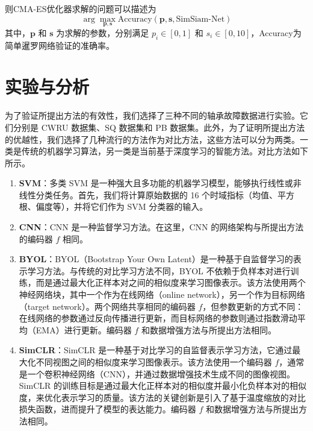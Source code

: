 \documentclass[master]{thesis-uestc}
\begin{document}
则CMA-ES优化器求解的问题可以描述为 
\begin{equation}
    \arg\max_{\mathbf{p}, \mathbf{s}} \text{Accuracy}(\mathbf{p}, \mathbf{s}, \text{SimSiam-Net})
\end{equation}
其中，\(\mathbf{p}\) 和 \(\mathbf{s}\) 为求解的参数，分别满足 \(p_i \in [0, 1]\) 和 \(s_i \in [0, 10]\)，Accuracy为简单暹罗网络验证的准确率。

\section{实验与分析}
为了验证所提出方法的有效性，我们选择了三种不同的轴承故障数据进行实验。它们分别是 CWRU 数据集、SQ 数据集和 PB 数据集。此外，为了证明所提出方法的优越性，我们选择了几种流行的方法作为对比方法，这些方法可以分为两类。一类是传统的机器学习算法，另一类是当前基于深度学习的智能方法。对比方法如下所示。
\begin{enumerate}
    \item \textbf{SVM}：多类 SVM 是一种强大且多功能的机器学习模型，能够执行线性或非线性分类任务。首先，我们将计算原始数据的 16 个时域指标（均值、平方根、偏度等），并将它们作为 SVM 分类器的输入。

    \item \textbf{CNN}：CNN 是一种监督学习方法。在这里，CNN 的网络架构与所提出方法的编码器 \(f\) 相同。

    \item \textbf{BYOL}：BYOL（Bootstrap Your Own Latent）是一种基于自监督学习的表示学习方法。与传统的对比学习方法不同，BYOL 不依赖于负样本对进行训练，而是通过最大化正样本对之间的相似度来学习图像表示。该方法使用两个神经网络块，其中一个作为在线网络（online network），另一个作为目标网络（target network）。两个网络共享相同的编码器 \(f\)，但参数更新的方式不同：在线网络的参数通过反向传播进行更新，而目标网络的参数则通过指数滑动平均（EMA）进行更新。编码器 \(f\) 和数据增强方法与所提出方法相同。
    
    \item \textbf{SimCLR}：SimCLR 是一种基于对比学习的自监督表示学习方法，它通过最大化不同视图之间的相似度来学习图像表示。该方法使用一个编码器 \(f\)，通常是一个卷积神经网络（CNN），并通过数据增强技术生成不同的图像视图。SimCLR 的训练目标是通过最大化正样本对的相似度并最小化负样本对的相似度，来优化表示学习的质量。该方法的关键创新是引入了基于温度缩放的对比损失函数，进而提升了模型的表达能力。编码器 \(f\) 和数据增强方法与所提出方法相同。

\end{enumerate}
\end{document}
